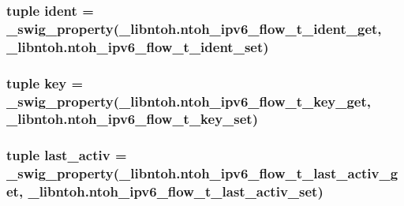 \hypertarget{classlibntoh_1_1ntoh__ipv6__flow__t_a219b3ba79a48452030ad36cf2519ee85}{
\subsubsection[{ident}]{\setlength{\rightskip}{0pt plus 5cm}tuple ident = {\bf \-\_\-swig\-\_\-property}(\-\_\-libntoh.\-ntoh\-\_\-ipv6\-\_\-flow\-\_\-t\-\_\-ident\-\_\-get, \-\_\-libntoh.\-ntoh\-\_\-ipv6\-\_\-flow\-\_\-t\-\_\-ident\-\_\-set)\hspace{0.3cm}{\ttfamily [static]}}}\label{classlibntoh_1_1ntoh__ipv6__flow__t_a219b3ba79a48452030ad36cf2519ee85}
\hypertarget{classlibntoh_1_1ntoh__ipv6__flow__t_a29eb8dd921f77e19e24a20bcd820c2ed}{
\subsubsection[{key}]{\setlength{\rightskip}{0pt plus 5cm}tuple key = {\bf \-\_\-swig\-\_\-property}(\-\_\-libntoh.\-ntoh\-\_\-ipv6\-\_\-flow\-\_\-t\-\_\-key\-\_\-get, \-\_\-libntoh.\-ntoh\-\_\-ipv6\-\_\-flow\-\_\-t\-\_\-key\-\_\-set)\hspace{0.3cm}{\ttfamily [static]}}}\label{classlibntoh_1_1ntoh__ipv6__flow__t_a29eb8dd921f77e19e24a20bcd820c2ed}
\hypertarget{classlibntoh_1_1ntoh__ipv6__flow__t_a43a06ba72aed8671dd1579dbf6f78b1a}{
\subsubsection[{last\-\_\-activ}]{\setlength{\rightskip}{0pt plus 5cm}tuple last\-\_\-activ = {\bf \-\_\-swig\-\_\-property}(\-\_\-libntoh.\-ntoh\-\_\-ipv6\-\_\-flow\-\_\-t\-\_\-last\-\_\-activ\-\_\-get, \-\_\-libntoh.\-ntoh\-\_\-ipv6\-\_\-flow\-\_\-t\-\_\-last\-\_\-activ\-\_\-set)\hspace{0.3cm}{\ttfamily [static]}}}\label{classlibntoh_1_1ntoh__ipv6__flow__t_a43a06ba72aed8671dd1579dbf6f78b1a}

